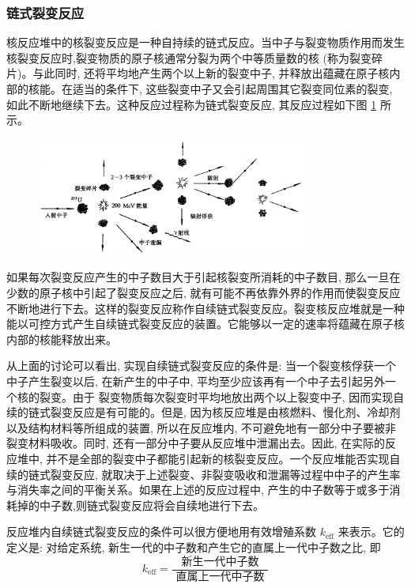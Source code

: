 \documentclass{Sichuan Normal University}
\begin{document}
\subsubsection{链式裂变反应}

核反应堆中的核裂变反应是一种自持续的链式反应。当中子与裂变物质作用而发生核裂变反应时,裂变物质的原子核通常分裂为两个中等质量数的核 (称为裂变碎片)。与此同时, 还将平均地产生两个以上新的裂变中子, 并释放出蕴藏在原子核内部的核能。在适当的条件下, 这些裂变中子又会引起周围其它裂变同位素的裂变, 如此不断地继续下去。这种反应过程称为链式裂变反应, 其反应过程如下图 \ref{fig:链式裂变反应} 所示。
\begin{figure}[H]
    \centering
    \includegraphics[width=0.8\textwidth]{./figure/链式裂变反应示意图.png}
    \label{fig:链式裂变反应}
    \end{figure}
如果每次裂变反应产生的中子数目大于引起核裂变所消耗的中子数目, 那么一旦在少数的原子核中引起了裂变反应之后, 就有可能不再依靠外界的作用而使裂变反应不断地进行下去。这样的裂变反应称作自续链式裂变反应。裂变核反应堆就是一种能以可控方式产生自续链式裂变反应的装置。它能够以一定的速率将蕴藏在原子核内部的核能释放出来。

从上面的讨论可以看出, 实现自续链式裂变反应的条件是: 当一个裂变核俘获一个中子产生裂变以后, 在新产生的中子中, 平均至少应该再有一个中子去引起另外一个核的裂变。由于
裂变物质每次裂变时平均地放出两个以上裂变中子, 因而实现自续的链式裂变反应是有可能的。但是, 因为核反应堆是由核燃料、慢化剂、冷却剂以及结构材料等所组成的装置, 所以在反应堆内, 不可避免地有一部分中子要被非裂变材料吸收。同时, 还有一部分中子要从反应堆中泄漏出去。因此, 在实际的反应堆中, 并不是全部的裂变中子都能引起新的核裂变反应。一个反应堆能否实现自续的链式裂变反应, 就取决于上述裂变、非裂变吸收和泄漏等过程中中子的产生率与消失率之间的平衡关系。如果在上述的反应过程中, 产生的中子数等于或多于消耗掉的中子数,则链式裂变反应将会自续地进行下去。

反应堆内自续链式裂变反应的条件可以很方便地用有效增殖系数 $k_{\mathrm{eff}}$ 来表示。它的定义是: 对给定系统, 新生一代的中子数和产生它的直属上一代中子数之比, 即
\begin{equation}
    k_{\mathrm{eff}}=\frac{\text { 新生一代中子数 }}{\text { 直属上一代中子数 }}
    \label{eq:有效增殖系数}
\end{equation}
\end{document}
